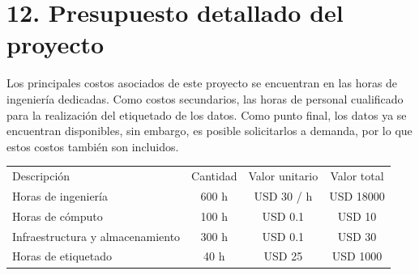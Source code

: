 \documentclass[
11pt, %
]{charter}
\begin{document}
\section{12. Presupuesto detallado del proyecto}
\label{sec:presupuesto}

Los principales costos asociados de este proyecto se encuentran en las horas de ingeniería dedicadas. Como costos secundarios, las horas de personal cualificado para la realización del etiquetado de los datos. Como punto final, los datos ya se encuentran disponibles, sin embargo, es posible solicitarlos a demanda, por lo que estos costos también son incluidos.

\begin{table}[htpb]
  \centering
  \begin{tabularx}{\linewidth}{@{}|X|c|r|r|@{}}
    \hline
    \rowcolor[HTML]{C0C0C0}
    \multicolumn{4}{|c|}{\cellcolor[HTML]{C0C0C0}COSTOS DIRECTOS}   \\ \hline

    \rowcolor[HTML]{C0C0C0} Descripción                         &
    \multicolumn{1}{c|}{\cellcolor[HTML]{C0C0C0}Cantidad}       &
    \multicolumn{1}{c|}{\cellcolor[HTML]{C0C0C0}Valor unitario} &
    \multicolumn{1}{c|}{\cellcolor[HTML]{C0C0C0}Valor total}        \\ \hline

    Horas de ingeniería                                         &
    \multicolumn{1}{c|}{600 h}                                  &
    \multicolumn{1}{c|}{USD 30 / h}                             &
    \multicolumn{1}{c|}{USD 18000}                                  \\ \hline

    Horas de cómputo                                            &
    \multicolumn{1}{c|}{100 h}                                  &
    \multicolumn{1}{c|}{USD 0.1}                                &
    \multicolumn{1}{c|}{USD 10}                                     \\ \hline

    Infraestructura y almacenamiento                            &
    \multicolumn{1}{c|}{300 h}                                  &
    \multicolumn{1}{c|}{USD 0.1}                                &
    \multicolumn{1}{c|}{USD 30}                                     \\ \hline

    Horas de etiquetado                                         &
    \multicolumn{1}{c|}{40 h}                                   &
    \multicolumn{1}{c|}{USD 25}                                 &
    \multicolumn{1}{c|}{USD 1000}                                   \\ \hline


\end{tabularx}
\end{table}
\end{document}
